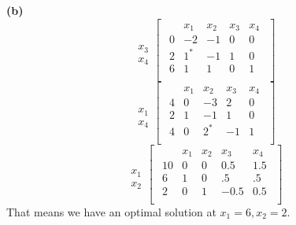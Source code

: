 \documentclass[12pt]{article}
\newenvironment{problem}[2][Problem]{\begin{trivlist}
\item[\hskip \labelsep {\bfseries #1}\hskip \labelsep {\bfseries #2.}]}{\end{trivlist}}
\newenvironment{subproblem}[1]{\textbf{(#1)}}{}
\theoremstyle{definition}
\begin{document}
\begin{problem}{3.12}
\begin{subproblem}{b}
\begin{equation}
\begin{array}{c}
\\
  \\
x_3 \\
x_4
\end{array}
\begin{bmatrix}
\begin{array}{c|cccc}
    & x_1 & x_2 & x_3 & x_4 \\ \hline
  0 & -2 & -1 & 0 & 0 \\ \hline
  2 & 1^* & -1 & 1 & 0  \\
  6 & 1 & 1 & 0 & 1 \\
\end{array}
\end{bmatrix}
\end{equation}
$ $ \\
\begin{equation}
\begin{array}{c}
\\
  \\
x_1 \\
x_4
\end{array}
\begin{bmatrix}
\begin{array}{c|cccc}
    & x_1 & x_2 & x_3 & x_4 \\ \hline
  4 & 0 & -3 & 2 & 0 \\ \hline
  2 & 1 & -1 & 1 & 0  \\
  4 & 0 & 2^* & -1 & 1 \\
\end{array}
\end{bmatrix}
\end{equation}
$ $ \\
\begin{equation}
\begin{array}{c}
\\
  \\
x_1 \\
x_2
\end{array}
\begin{bmatrix}
\begin{array}{c|cccc}
    & x_1 & x_2 & x_3 & x_4 \\ \hline
  10 & 0 & 0 & 0.5 & 1.5 \\ \hline
  6 & 1 & 0 & .5 & .5  \\
  2 & 0 & 1 & -0.5 & 0.5 \\
\end{array}
\end{bmatrix}
\end{equation}
That means we have an optimal solution at $x_1=6, x_2=2$.

\end{subproblem}


\end{problem}
\end{document}
